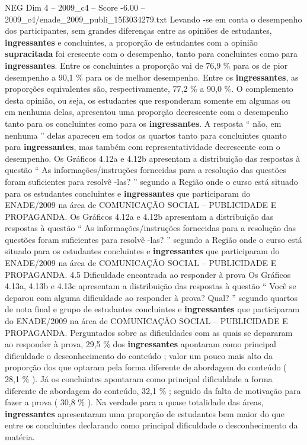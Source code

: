 \begin{textsample}{NEG Dim 4 – 2009\_c4 – Score -6.00 – 2009\_c4/enade\_2009\_publi\_15f3034279.txt}
Levando -se em conta o desempenho dos participantes, sem grandes diferenças entre as opiniões de estudantes, \textbf{ingressantes} e concluintes, a proporção de estudantes com a opinião \textbf{supracitada} foi crescente com o desempenho, tanto para concluintes como para \textbf{ingressantes}.
Entre os concluintes a proporção vai de 76,9 \% para os de pior desempenho a 90,1 \% para os de melhor desempenho.
Entre os \textbf{ingressantes}, as proporções equivalentes são, respectivamente, 77,2 \% a 90,0 \%.
O complemento desta opinião, ou seja, os estudantes que responderam somente em algumas ou em nenhuma delas, apresentou uma proporção decrescente com o desempenho tanto para os concluintes como para os \textbf{ingressantes}.
A resposta “ não, em nenhuma ” delas apareceu em todos os quartos tanto para concluintes quanto para \textbf{ingressantes}, mas também com representatividade decrescente com o desempenho.
Os Gráficos 4.12a e 4.12b apresentam a distribuição das respostas à questão “ As informações/instruções fornecidas para a resolução das questões foram suficientes para resolvê -las? ” segundo a Região onde o curso está situado para os estudantes concluintes e \textbf{ingressantes} que participaram do ENADE/2009 na área de COMUNICAÇÃO SOCIAL – PUBLICIDADE E PROPAGANDA.
Os Gráficos 4.12a e 4.12b apresentam a distribuição das respostas à questão “ As informações/instruções fornecidas para a resolução das questões foram suficientes para resolvê -las? ” segundo a Região onde o curso está situado para os estudantes concluintes e \textbf{ingressantes} que participaram do ENADE/2009 na área de COMUNICAÇÃO SOCIAL – PUBLICIDADE E PROPAGANDA. 4.5 Dificuldade encontrada ao responder à prova Os Gráficos 4.13a, 4.13b e 4.13c apresentam a distribuição das respostas à questão “ Você se deparou com alguma dificuldade ao responder à prova?
Qual? ” segundo quartos de nota final e grupo de estudantes concluintes e \textbf{ingressantes} que participaram do ENADE/2009 na área de COMUNICAÇÃO SOCIAL – PUBLICIDADE E PROPAGANDA.
Perguntados sobre as dificuldades com as quais se depararam ao responder à prova, 29,5 \% dos \textbf{ingressantes} apontaram como principal dificuldade o desconhecimento do conteúdo ; valor um pouco mais alto da proporção dos que optaram pela forma diferente de abordagem do conteúdo ( 28,1 \% ).
Já os concluintes apontaram como principal dificuldade a forma diferente de abordagem do conteúdo, 32,1 \% ; seguido da falta de motivação para fazer a prova ( 30,8 \% ).
Na verdade para a quase totalidade das áreas, \textbf{ingressantes} apresentaram uma proporção de estudantes bem maior do que entre os concluintes declarando como principal dificuldade o desconhecimento da matéria.

\end{textsample}
